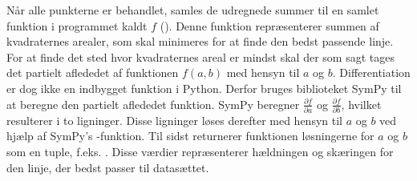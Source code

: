 Når alle punkterne er behandlet, samles de udregnede summer til en samlet funktion i programmet kaldt $f$ (). Denne funktion repræsenterer summen af kvadraternes arealer, som skal minimeres for at finde den bedst passende linje. For at finde det sted hvor kvadraternes areal er mindst skal der som sagt tages det partielt aflededet af funktionen $f(a,b)$ med hensyn til $a$ og $b$. Differentiation er dog ikke en indbygget funktion i Python. Derfor bruges biblioteket SymPy til at beregne den partielt aflededet funktion. SymPy beregner $\frac{\partial f}{\partial a}$ og $\frac{\partial f}{\partial b}$, hvilket resulterer i to ligninger. Disse ligninger løses derefter med hensyn til $a$ og $b$ ved hjælp af SymPy's -funktion. Til sidst returnerer funktionen løsningerne for $a$ og $b$ som en tuple, f.eks. \pythoninline{[a, b]}. Disse værdier repræsenterer hældningen og skæringen for den linje, der bedst passer til datasættet.

